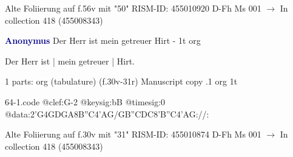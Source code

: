 \documentclass[twocolumn]{book}
\begin{document}
\newline Alte Foliierung auf f.56v mit "50"
\newline RISM-ID: 455010920
\newline D-Fh  Ms 001
\newline $\rightarrow$ In collection 418 (455008343)
      
\newline \par \vspace{7pt} \textcolor{darkblue}{\textbf{Anonymus  }}
\newline Der Herr ist mein getreuer Hirt - 1t
\newline org
\newline \begin{itshape}[f.30v, at left:] Der Herr ist | mein getreuer | Hirt.\end{itshape} 
\newline \textcolor{darkblue}{}  1 parts: org (tabulature)  (f.30v-31r)
\newline Manuscript copy
.1  org  1t  
\begin{filecontents*}{64-1.code}
@clef:G-2
@keysig:bB
@timesig:0
@data:2'G4GDGA{8B''C}4'AG/GB''CDC{8'B''C}4'AG://:
\end{filecontents*}
\newline
%

\newline Alte Foliierung auf f.30v mit "31"
\newline RISM-ID: 455010874
\newline D-Fh  Ms 001
\newline $\rightarrow$ In collection 418 (455008343)
      
\end{document}
